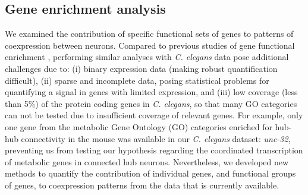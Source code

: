 \documentclass[10pt,letterpaper]{article}
\begin{document}
\subsection*{Gene enrichment analysis}
We examined the contribution of specific functional sets of genes to patterns of coexpression between neurons.
Compared to previous studies of gene functional enrichment \cite{Fulcher:2016ck, Vertes2016a, Parkes:2017dn}, performing similar analyses with \emph{C. elegans} data pose additional challenges due to:
(i) binary expression data (making robust quantification difficult),
(ii) sparse and incomplete data, posing statistical problems for quantifying a signal in genes with limited expression,
and (iii) low coverage (less than 5\%) of the protein coding genes in \emph{C. elegans}, so that many GO categories can not be tested due to insufficient coverage of relevant genes.
For example, only one gene from the metabolic Gene Ontology (GO) categories enriched for hub-hub connectivity in the mouse \cite{Fulcher:2016ck} was available in our \emph{C. elegans} dataset: \emph{unc-32}, preventing us from testing our hypothesis regarding the coordinated transcription of metabolic genes in connected hub neurons.
Nevertheless, we developed new methods to quantify the contribution of individual genes, and functional groups of genes, to coexpression patterns from the data that is currently available.

\end{document}

